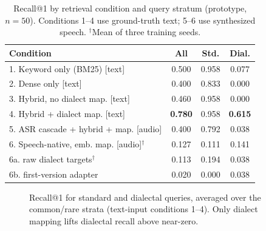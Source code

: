 \documentclass[conference]{IEEEtran}
\begin{document}
\begin{table}[t]
\caption{Recall@1 by retrieval condition and query stratum (prototype, $n{=}50$). Conditions 1--4 use ground-truth text; 5--6 use synthesized speech. $^\dagger$Mean of three training seeds.}
\centering
\footnotesize
\begin{tabular}{@{}lccc@{}}
\toprule
\textbf{Condition} & \textbf{All} & \textbf{Std.} & \textbf{Dial.} \\
\midrule
1. Keyword only (BM25) [text]           & 0.500 & 0.958 & 0.077 \\
2. Dense only [text]                    & 0.400 & 0.833 & 0.000 \\
3. Hybrid, no dialect map. [text]       & 0.460 & 0.958 & 0.000 \\
4. Hybrid + dialect map. [text]         & \textbf{0.780} & 0.958 & \textbf{0.615} \\
5. ASR cascade + hybrid + map. [audio]  & 0.400 & 0.792 & 0.038 \\
6. Speech-native, emb. map. [audio]$^\dagger$ & 0.127 & 0.111 & 0.141 \\
\quad 6a. raw dialect targets$^\dagger$       & 0.113 & 0.194 & 0.038 \\
\quad 6b. first-version adapter          & 0.020 & 0.000 & 0.038 \\
\bottomrule
\end{tabular}
\label{tab:retrieval}
\end{table}

\begin{figure}[t]
\centering
{}
\caption{Recall@1 for standard and dialectal queries, averaged over the common/rare strata (text-input conditions 1--4). Only dialect mapping lifts dialectal recall above near-zero.}
\label{fig:retrieval-chart}
\end{figure}
\end{document}
